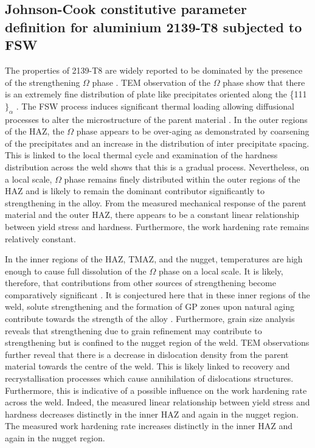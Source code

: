 	\subsection{Johnson-Cook constitutive parameter definition for aluminium 2139-T8 subjected to FSW}
	\label{RADJCModel}
	The properties of 2139-T8 are widely reported to be dominated by the presence of the strengthening $\Omega$ phase \cite{Cho2006}. TEM observation of the $\Omega$ phase show that there is an extremely fine distribution of plate like precipitates oriented along the \{111$\}_\alpha$ \cite{Cho2006,Bakavos2008}. The FSW process induces significant thermal loading allowing diffusional processes to alter the microstructure of the parent material \cite{Shercliff1990,Shercliff1990a}. In the outer regions of the HAZ, the $\Omega$ phase appears to be over-aging as demonstrated by coarsening of the precipitates and an increase in the distribution of inter precipitate spacing. This is linked to the local thermal cycle and examination of the hardness distribution across the weld shows that this is a gradual process. Nevertheless, on a local scale, $\Omega$ phase remains finely distributed within the outer regions of the HAZ and is likely to remain the dominant contributor significantly to strengthening in the alloy. 
	From the measured mechanical response of the parent material and the outer HAZ, there appears to be a constant linear relationship between yield stress and hardness. Furthermore, the work hardening rate remains relatively constant.
	
	In the inner regions of the HAZ, TMAZ, and the nugget, temperatures are high enough to cause full dissolution of the $\Omega$ phase on a local scale. It is likely, therefore, that contributions from other sources of strengthening become comparatively significant \cite{Shercliff1990a}. It is conjectured here that in these inner regions of the weld, solute strengthening and the formation of GP zones upon natural aging contribute towards the strength of the alloy \cite{Bakavos2008}. Furthermore, grain size analysis reveals that strengthening due to grain refinement may contribute to strengthening but is confined to the nugget region of the weld. TEM observations further reveal that there is a decrease in dislocation density from the parent material towards the centre of the weld. This is likely linked to recovery and recrystallisation processes which cause annihilation of dislocations structures. Furthermore, this is indicative of a possible influence on the work hardening rate across the weld. Indeed, the measured linear relationship between yield stress and hardness decreases distinctly in the inner HAZ and again in the nugget region. The measured work hardening rate increases distinctly in the inner HAZ and again in the nugget region.
	
